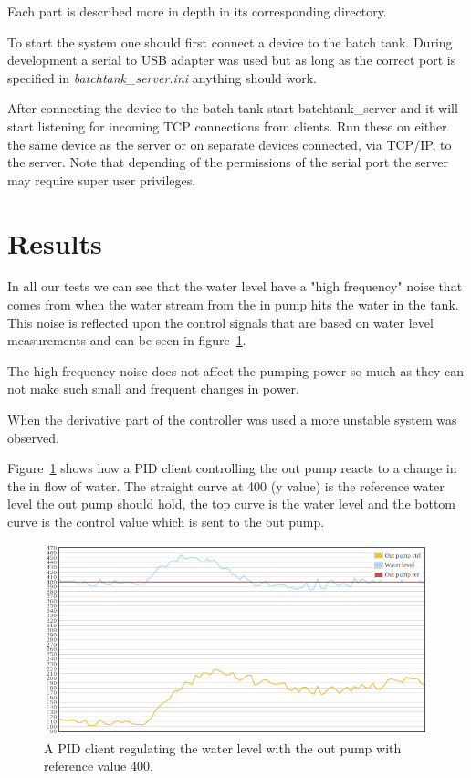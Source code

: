 \documentclass{article}
\begin{document}
Each part is described more in depth in its corresponding directory.

To start the system one should first connect a device to the batch tank.
During development a serial to USB adapter was used but as long as the
correct port is specified in \emph{batchtank\_server.ini} anything
should work.

After connecting the device to the batch tank start batchtank\_server and it will
start listening for incoming TCP connections from clients. Run these on either
the same device as the server or on separate devices connected, via TCP/IP, to
the server. Note that depending of the permissions of the serial port
the server may require super user privileges.

\section{Results}\label{results}
In all our tests we can see that the water level have a "high frequency" noise
that comes from when the water stream from the in pump hits the water in the
tank. This noise is reflected upon the control signals that are based on water
level measurements and can be seen in figure~\ref{fig:out pump}. 

The high frequency noise does not affect the pumping power so much as they can not make such small and frequent changes in power.

When the derivative part of the controller was used a more unstable system  was
observed.

Figure~\ref{fig:out pump} shows how a PID client controlling the out pump reacts
to a change in the in flow of water. The straight curve at 400 (y value) is the
reference water level the out pump should hold, the top curve is the water level
and the bottom curve is the control value which is sent to the out pump.

\begin{figure}[H]
\includegraphics[width=1.0\textwidth]{plot1.png}
\caption{A PID client regulating the water level with the out pump with reference value 400.}
\label{fig:out pump}
\end{figure}
\end{document}
